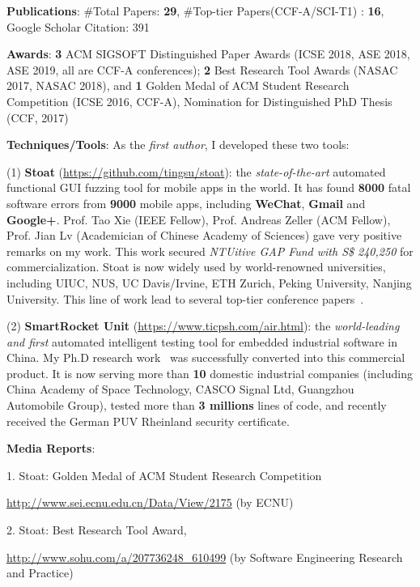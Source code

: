 \documentclass[a4paper]{article}
\begin{document}
{\noindent\textbf{Publications}: \#Total Papers: \textbf{29}, \#Top-tier Papers(CCF-A/SCI-T1) : \textbf{16}, Google Scholar Citation: 391
	
\noindent\textbf{Awards}: \textbf{3} ACM SIGSOFT Distinguished Paper Awards (ICSE 2018, ASE 2018, ASE 2019, all are CCF-A conferences);
 \textbf{2} Best Research Tool Awards (NASAC 2017, NASAC 2018), and \textbf{1} Golden Medal of ACM Student Research Competition (ICSE 2016, CCF-A), Nomination for Distinguished PhD Thesis (CCF, 2017)
 
\noindent\textbf{Techniques/Tools}: As the \emph{first author}, I developed these two tools:

 (1) \textbf{Stoat} (\url{https://github.com/tingsu/stoat}): the \emph{state-of-the-art} automated functional GUI fuzzing tool for mobile apps in the world. It has found \textbf{8000} fatal software errors from \textbf{9000} mobile apps, including \textbf{WeChat}, \textbf{Gmail} and \textbf{Google+}. Prof. Tao Xie (IEEE Fellow), Prof. Andreas Zeller (ACM Fellow), Prof. Jian Lv (Academician of Chinese Academy of Sciences) gave very positive remarks on my work. This work secured \emph{NTUitive GAP Fund with S\$ 240,250} for commercialization. Stoat is now widely used by world-renowned universities, including UIUC, NUS, UC Davis/Irvine, ETH Zurich, Peking University, Nanjing University.
 This line of work lead to several top-tier conference papers~\cite{fsmdroid,stoat,study,study2,apechecker,ausera,recdroid,ui2code,storydroid}.
 
 (2) \textbf{SmartRocket Unit} (\url{https://www.ticpsh.com/air.html}): the \emph{world-leading and first} automated intelligent testing tool for embedded industrial software in China. My Ph.D research work~\cite{sere14,icse15,csur17,scis16,smartunit} was successfully converted into this commercial product. It is now serving more than \textbf{10} domestic industrial companies (including China Academy of Space Technology, CASCO Signal Ltd, Guangzhou Automobile Group), tested more than \textbf{3 millions} lines of code, and recently received the German PUV Rheinland security certificate.
  
\noindent\textbf{Media Reports}:

 1. Stoat: Golden Medal of ACM Student Research Competition
 
 \url{http://www.sei.ecnu.edu.cn/Data/View/2175} (by ECNU)
 
 2. Stoat: Best Research Tool Award, 
 
 \url{http://www.sohu.com/a/207736248_610499} (by Software Engineering Research and Practice)
 
}
\end{document}
